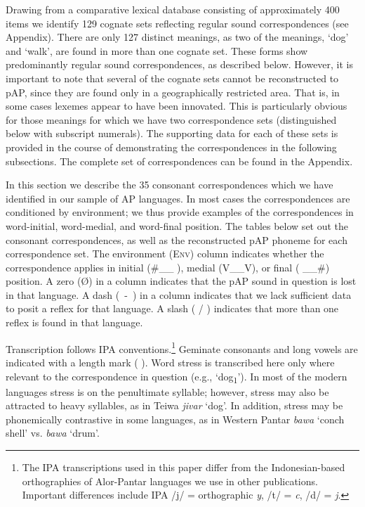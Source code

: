  Drawing from a comparative lexical database consisting of approximately 400 items we identify 129 cognate sets reflecting regular sound correspondences (see Appendix). There are only 127 distinct meanings, as two of the meanings, `dog' and `walk', are found in more than one cognate set. These forms show predominantly regular sound correspondences, as described below. However, it is important to note that several of the cognate sets cannot be reconstructed to pAP, since they are found only in a geographically restricted area. That is, in some cases lexemes appear to have been innovated. This is particularly obvious for those meanings for which we have two correspondence sets (distinguished below with subscript numerals). The supporting data for each of these sets is provided in the course of demonstrating the correspondences in the following subsections. The complete set of correspondences can be found in the Appendix.

In this section we describe the 35 consonant correspondences which we have identified in our sample of AP languages. In most cases the correspondences are conditioned by environment; we thus provide examples of the correspondences in word-initial, word-medial, and word-final position. The tables below set out the consonant correspondences, as well as the reconstructed pAP phoneme for each correspondence set. The environment (\textsc{Env}) column indicates whether the correspondence applies in initial (\#\_\_ ), medial (V\_\_V), or final ( \_\_\#) position. A zero ({\O}) in a column indicates that the pAP sound in question is lost in that language. A dash (~-~) in a column indicates that we lack sufficient data to posit a reflex for that language. A slash ( / ) indicates that more than one reflex is found in that language.

Transcription follows IPA conventions.\footnote{ The IPA transcriptions used in this paper differ from the Indonesian-based orthographies of Alor-Pantar languages we use in other publications. Important differences include IPA /j/ = orthographic \textit{y}, /t{\textesh}/ = \textit{c}, /d{\textyogh}/ = \textit{j}.} Geminate consonants and long vowels are indicated with a length mark ( {\textlengthmark} ). Word stress is transcribed here only where relevant to the correspondence in question (e.g., `dog\textsubscript{1}'). In most of the modern languages stress is on the penultimate syllable; however, stress may also be attracted to heavy syllables, as in Teiwa \textit{ji{\textprimstress}var} `dog'. In addition, stress may be phonemically contrastive in some languages, as in Western Pantar \textit{ba}\textit{{\textprimstress}}\textit{wa} `conch shell' vs. \textit{{\textprimstress}}\textit{bawa} `drum'.

